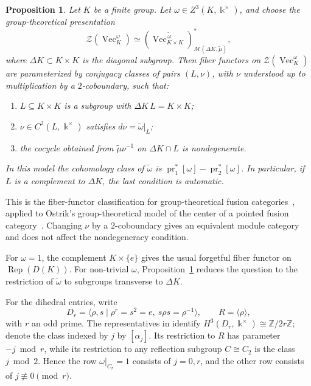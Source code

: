 \documentclass[12pt]{amsart}
\theoremstyle{plain}
\newtheorem{proposition}[theorem]{Proposition}
\theoremstyle{definition} %
\theoremstyle{remark} %
\newcommand{\ku}{{\Bbbk}} %
\DeclareMathOperator{\VecCat}{Vec}
\newcommand{\ModCat}{\mathcal{M}}
\newcommand{\Vect}[1]{\VecCat_{#1}}
\newcommand{\Rep}{\operatorname{Rep}}
\newcommand{\pr}{\operatorname{pr}}
\begin{document}
\begin{proposition}\label{prop:twisted_double_test}
Let $K$ be a finite group. Let $\omega\in Z^3(K,\ku^\times)$, and choose the group-theoretical presentation
\[
\mathcal{Z}(\Vect{K}^{\omega})
\simeq
(\Vect{K\times K}^{\,\widetilde{\omega}})^*_{\ModCat(\Delta K,\widetilde{\mu})},
\]
where $\Delta K\subset K\times K$ is the diagonal subgroup. Then fiber functors on $\mathcal{Z}(\Vect{K}^{\omega})$ are parameterized by conjugacy classes of pairs $(L,\nu)$, with $\nu$ understood up to multiplication by a $2$-coboundary, such that:
\begin{enumerate}
\item $L\subseteq K\times K$ is a subgroup with $\Delta K\,L=K\times K$;
\item $\nu\in C^2(L,\ku^\times)$ satisfies $d\nu=\widetilde{\omega}|_L$;
\item the cocycle obtained from $\widetilde{\mu}\nu^{-1}$ on $\Delta K\cap L$ is nondegenerate.
\end{enumerate}
In this model the cohomology class of $\widetilde{\omega}$ is $\pr_1^*[\omega]-\pr_2^*[\omega]$. In particular, if $L$ is a complement to $\Delta K$, the last condition is automatic.
\end{proposition}
This is the fiber-functor classification for group-theoretical fusion categories~\cite[Section~2]{Nik08}, applied to Ostrik's group-theoretical model of the center of a pointed fusion category~\cite[Theorem~3.2, Proposition~3.1, Corollary~3.1 and Corollary~3.2]{Os03}. Changing $\nu$ by a $2$-coboundary gives an equivalent module category and does not affect the nondegeneracy condition.

For \(\omega=1\), the complement \(K\times\{e\}\) gives the usual
forgetful fiber functor on \(\Rep(D(K))\). For non-trivial \(\omega\),
Proposition~\ref{prop:twisted_double_test} reduces the question to the
restriction of \(\widetilde\omega\) to subgroups transverse to \(\Delta K\).

For the dihedral entries, write
\[
D_r=\langle\rho,s\mid \rho^r=s^2=e,\ s\rho s=\rho^{-1}\rangle,
\qquad R=\langle\rho\rangle,
\]
with \(r\) an odd prime. The representatives in
\cite[Section~6.3, Equation~(6.20)]{CGR00} identify
\(H^3(D_r,\ku^\times)\cong\mathbb Z/2r\mathbb Z\); denote the class indexed
by \(j\) by \([\alpha_j]\). Its restriction to \(R\) has parameter
\(-j\bmod r\), while its restriction to any reflection subgroup
\(C\cong C_2\) is the class \(j\bmod2\). Hence the row
\(\omega|_{C_r}=1\) consists of \(j=0,r\), and the other row consists of
\(j\not\equiv0\pmod r\).
\end{document}
